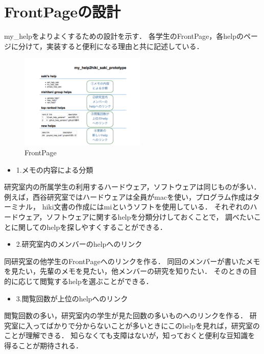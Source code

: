 \section{FrontPageの設計}
my\_helpをよりよくするための設計を示す．
各学生のFrontPage，各helpのページに分けて，実装すると便利になる理由と共に記述している．

\begin{figure}[htbp]
\begin{center}
\includegraphics[width=6.0cm,bb=0 0 600 800]{my_help2hiki_saki.014.png}
\caption{FrontPage}
\label{default}\end{center}\end{figure}

\begin{itemize}
\item 1.メモの内容による分類
\end{itemize}
\begin{description}
\item 研究室内の所属学生の利用するハードウェア，ソフトウェアは同じものが多い．
例えば，西谷研究室ではハードウェアは全員がmacを使い，プログラム作成はターミナル，
hiki文書の作成にはmiというソフトを使用している．
それぞれのハードウェア，ソフトウェアに関するhelpを分類分けしておくことで，
調べたいことに関してのhelpを探しやすくすることができる．\\
\end{description}
\newpage
\begin{itemize}
\item 2.研究室内のメンバーのhelpへのリンク
\end{itemize}
\begin{description}
\item 同研究室の他学生のFrontPageへのリンクを作る．
同回のメンバーが書いたメモを見たい，先輩のメモを見たい，他メンバーの研究を知りたい．
そのときの目的に応じて閲覧するhelpを選ぶことができる．\\
\end{description}

\begin{itemize}
\item 3.閲覧回数が上位のhelpへのリンク
\end{itemize}
\begin{description}
\item 閲覧回数の多い，研究室内の学生が見た回数の多いものへのリンクを作る．
研究室に入ってばかりで分からないことが多いときにこのhelpを見れば，研究室のことが理解できる．
知らなくても支障はないが，知っておくと便利な豆知識を得ることが期待される．\\
\end{description}

